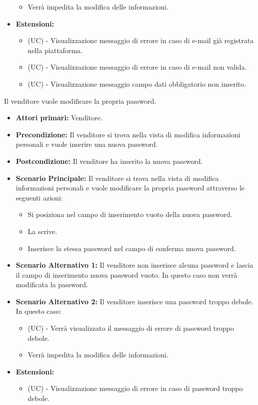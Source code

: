\begin{itemize}
\begin{itemize}
        \item Verrà impedita la modifica delle informazioni.
    \end{itemize}
    \item \textbf{Estensioni:}
    \begin{itemize}
        \item (UC) - Visualizzazione messaggio di errore in caso di e-mail già registrata nella piattaforma.
        \item (UC) - Visualizzazione messaggio di errore in caso di e-mail non valida.
        \item (UC) - Visualizzazione messaggio campo dati obbligatorio non inserito.
    \end{itemize}
\end{itemize}

Il venditore vuole modificare la propria password.
\begin{itemize}
    \item \textbf{Attori primari:} Venditore.
    \item \textbf{Precondizione:} Il venditore si trova nella vista di modifica informazioni personali e vuole inserire una nuova password.
    \item \textbf{Postcondizione:} Il venditore ha inserito la nuova password.
    \item \textbf{Scenario Principale:} Il venditore si trova nella vista di modifica informazioni personali e vuole modificare la propria password attraverso le seguenti azioni:
        \begin{itemize}
            \item Si posiziona nel campo di inserimento vuoto della nuova password.
            \item La scrive.
            \item Inserisce la stessa password nel campo di conferma nuova password.
        \end{itemize}
    \item \textbf{Scenario Alternativo 1:} Il venditore non inserisce alcuna password e lascia il campo di inserimento nuova password vuoto. In questo caso non verrà modificata la password.
    \item \textbf{Scenario Alternativo 2:} Il venditore inserisce una password troppo debole. In questo caso:
    \begin{itemize}
        \item (UC) - Verrà visualizzato il messaggio di errore di password troppo debole.
        \item Verrà impedita la modifica delle informazioni.
    \end{itemize}
    \item \textbf{Estensioni:}
    \begin{itemize}
        \item (UC) - Visualizzazione messaggio di errore in caso di password troppo debole.
    \end{itemize}
\end{itemize}

